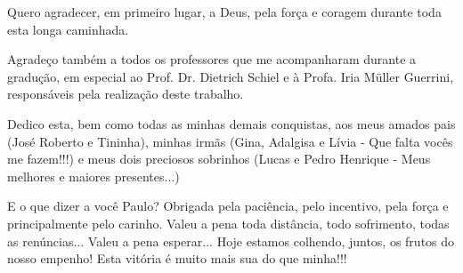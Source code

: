 Quero agradecer, em primeiro lugar, a Deus, pela força e coragem durante toda esta longa caminhada.

Agradeço também a todos os professores que me acompanharam durante a gradução, em especial ao Prof. Dr. Dietrich Schiel e à Profa. Iria Müller Guerrini, responsáveis pela realização deste trabalho.

Dedico esta, bem como todas as minhas demais conquistas, aos meus amados pais (José Roberto e Tininha), minhas irmãs (Gina, Adalgisa e Lívia - Que falta vocês me fazem!!!) e meus dois preciosos sobrinhos (Lucas e Pedro Henrique - Meus melhores e maiores presentes...)

E o que dizer a você Paulo? 
Obrigada pela paciência, pelo incentivo, pela força e principalmente pelo carinho. 
Valeu a pena toda distância, todo sofrimento, todas as renúncias... Valeu a pena esperar... Hoje estamos colhendo, juntos, os frutos do nosso empenho!
Esta vitória é muito mais sua do que minha!!!